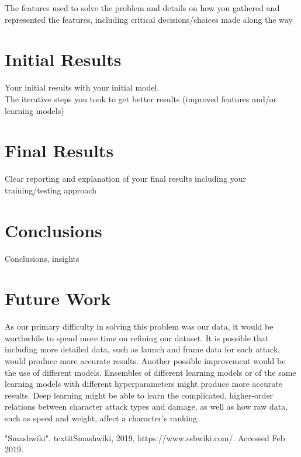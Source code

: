 \documentclass{article}
\begin{document}
The features used to solve the problem and details on how you
gathered and represented the features, including critical
decisions/choices made along the way


\section{Initial Results}

Your initial results with your initial model.\\
The iterative steps you took to get better results (improved features and/or learning models)

\section{Final Results}

Clear reporting and explanation of your final results including your training/testing approach

\section{Conclusions}

Conclusions, insights

\section{Future Work}

As our primary difficulty in solving this problem was our data, it would be worthwhile to spend more time on refining our dataset.
It is possible that including more detailed data, such as launch and frame data for each attack, would produce more accurate results.
Another possible improvement would be the use of different models.
Ensembles of different learning models or of the same learning models with different hyperparameters might produce more accurate results.
Deep learning might be able to learn the complicated, higher-order relations between character attack types and damage, as well as how raw data,
such as speed and weight, affect a character's ranking.

\appendix

\begin{thebibliography}{1}
"Smashwiki". textit{Smashwiki}, 2019, https://www.ssbwiki.com/. Accessed Feb 2019.
\end{thebibliography}
\end{document}
